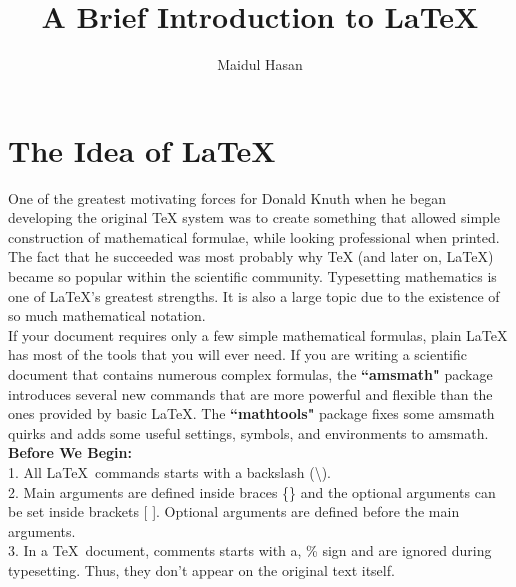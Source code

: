 \documentclass[12pt, twocolumn]{article}
\title{A Brief Introduction to \LaTeX}
\author{Maidul Hasan}
\date{}
\begin{document}
 
 \maketitle
 
 \section*{The Idea of \LaTeX}
 One of the greatest motivating forces for Donald Knuth when he began developing the original TeX system was to create something that allowed simple construction of mathematical formulae, while looking professional when printed. The fact that he succeeded was most probably why TeX (and later on, LaTeX) became so popular within the scientific community. Typesetting mathematics is one of LaTeX's greatest strengths. It is also a large topic due to the existence of so much mathematical notation. \\

If your document requires only a few simple mathematical formulas, plain LaTeX has most of the tools that you will ever need. If you are writing a scientific document that contains numerous complex formulas, the \textbf{``amsmath"} package introduces several new commands that are more powerful and flexible than the ones provided by basic LaTeX. The \textbf{``mathtools"} package fixes some amsmath quirks and adds some useful settings, symbols, and environments to amsmath. \\

 \noindent \textbf{Before We Begin:} \\
 1. All \LaTeX\ commands starts with a backslash (\textbackslash). \\
 2. Main arguments are defined inside braces \{\} and the optional arguments can be set inside brackets [ ]. Optional arguments are defined before the main arguments. \\
 3. In a \TeX\ document, comments starts with a, \% sign and are ignored during typesetting. Thus, they don't appear on the original text itself.
\end{document}
